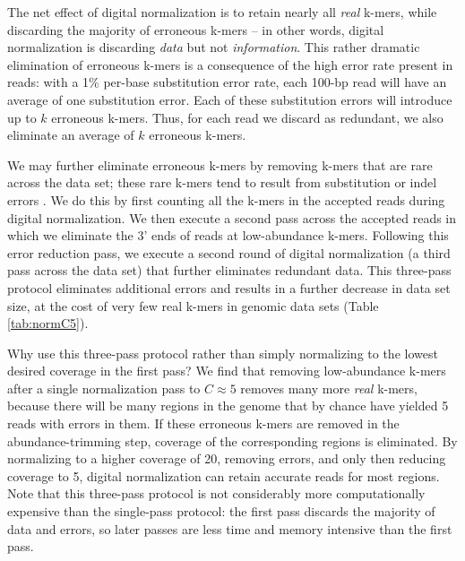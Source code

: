 The net effect of digital normalization is to retain nearly all {\em
  real} k-mers, while discarding the majority of erroneous k-mers --
in other words, digital normalization is discarding {\em data} but not
{\em information}.  This rather dramatic elimination of erroneous
k-mers is a consequence of the high error rate present in reads: with
a 1\% per-base substitution error rate, each 100-bp read will have an
average of one substitution error. Each of these substitution errors
will introduce up to $k$ erroneous k-mers.  Thus, for each read we
discard as redundant, we also eliminate an average of $k$ erroneous
k-mers.

We may further eliminate erroneous k-mers by removing k-mers that are
rare across the data set; these rare k-mers tend to result from
substitution or indel errors \cite{pubmed21114842}.  We do this by
first counting all the k-mers in the accepted reads during digital
normalization.  We then execute a second pass across the accepted
reads in which we eliminate the 3' ends of reads at low-abundance
k-mers.  Following this error reduction pass, we execute a
second round of digital normalization (a third pass across the data
set) that further eliminates redundant data.  This three-pass protocol
eliminates additional errors and results in a further decrease in data
set size, at the cost of very few real k-mers in genomic data sets
(Table \ref{tab:normC5}).

Why use this three-pass protocol rather than simply normalizing to the
lowest desired coverage in the first pass?  We find that removing
low-abundance k-mers after a single normalization pass to $C \approx
5$ removes many more {\em real} k-mers, because there will be many
regions in the genome that by chance have yielded 5 reads with errors
in them. If these erroneous k-mers are removed in the abundance-trimming step,
coverage of the corresponding regions is eliminated.  By normalizing
to a higher coverage of 20, removing errors, and only then reducing
coverage to 5, digital normalization can retain accurate reads for most
regions.  Note that this three-pass protocol is not considerably more
computationally expensive than the single-pass protocol: the first
pass discards the majority of data and errors, so later passes are
less time and memory intensive than the first pass.


